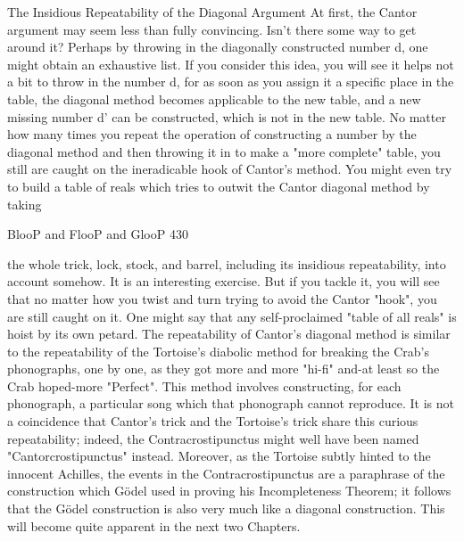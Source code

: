            The Insidious Repeatability of the Diagonal Argument
At first, the Cantor argument may seem less than fully convincing. Isn't there some way
to get around it? Perhaps by throwing in the diagonally constructed number d, one might
obtain an exhaustive list. If you consider this idea, you will see it helps not a bit to throw
in the number d, for as soon as you assign it a specific place in the table, the diagonal
method becomes applicable to the new table, and a new missing number d' can be
constructed, which is not in the new table. No matter how many times you repeat the
operation of constructing a number by the diagonal method and then throwing it in to
make a "more complete" table, you still are caught on the ineradicable hook of Cantor’s
method. You might even try to build a table of reals which tries to outwit the Cantor
diagonal method by taking




BlooP and FlooP and GlooP                                                                 430

the whole trick, lock, stock, and barrel, including its insidious repeatability, into account
somehow. It is an interesting exercise. But if you tackle it, you will see that no matter
how you twist and turn trying to avoid the Cantor "hook", you are still caught on it. One
might say that any self-proclaimed "table of all reals" is hoist by its own petard.
        The repeatability of Cantor's diagonal method is similar to the repeatability of the
Tortoise's diabolic method for breaking the Crab's phonographs, one by one, as they got
more and more "hi-fi" and-at least so the Crab hoped-more "Perfect". This method
involves constructing, for each phonograph, a particular song which that phonograph
cannot reproduce. It is not a coincidence that Cantor's trick and the Tortoise's trick share
this curious repeatability; indeed, the Contracrostipunctus might well have been named
"Cantorcrostipunctus" instead. Moreover, as the Tortoise subtly hinted to the innocent
Achilles, the events in the Contracrostipunctus are a paraphrase of the construction which
Gödel used in proving his Incompleteness Theorem; it follows that the Gödel
construction is also very much like a diagonal construction. This will become quite
apparent in the next two Chapters.

